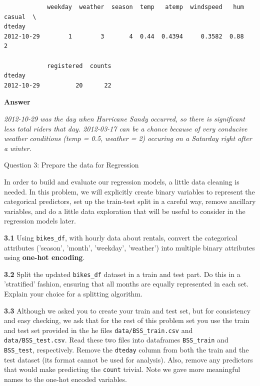 \documentclass[11pt]{article}
\begin{document}
    
    
    \begin{verbatim}
            weekday  weather  season  temp   atemp  windspeed   hum  casual  \
dteday                                                                        
2012-10-29        1        3       4  0.44  0.4394     0.3582  0.88       2   

            registered  counts  
dteday                          
2012-10-29          20      22  
    \end{verbatim}

    
    \textbf{Answer}

\emph{2012-10-29 was the day when Hurricane Sandy occurred, so there is
significant less total riders that day. 2012-03-17 can be a chance
because of very conducive weather conditions (temp = 0.5, weather = 2)
occuring on a Saturday right after a winter.}

     Question 3: Prepare the data for Regression

In order to build and evaluate our regression models, a little data
cleaning is needed. In this problem, we will explicitly create binary
variables to represent the categorical predictors, set up the train-test
split in a careful way, remove ancillary variables, and do a little data
exploration that will be useful to consider in the regression models
later.

\textbf{3.1} Using \texttt{bikes\_df}, with hourly data about rentals,
convert the categorical attributes ('season', 'month', 'weekday',
'weather') into multiple binary attributes using \textbf{one-hot
encoding}.

\textbf{3.2} Split the updated \texttt{bikes\_df} dataset in a train and
test part. Do this in a 'stratified' fashion, ensuring that all months
are equally represented in each set. Explain your choice for a splitting
algorithm.

\textbf{3.3} Although we asked you to create your train and test set,
but for consistency and easy checking, we ask that for the rest of this
problem set you use the train and test set provided in the he files
\texttt{data/BSS\_train.csv} and \texttt{data/BSS\_test.csv}. Read these
two files into dataframes \texttt{BSS\_train} and \texttt{BSS\_test},
respectively. Remove the \texttt{dteday} column from both the train and
the test dataset (its format cannot be used for analysis). Also, remove
any predictors that would make predicting the \texttt{count} trivial.
Note we gave more meaningful names to the one-hot encoded variables.
\end{document}
